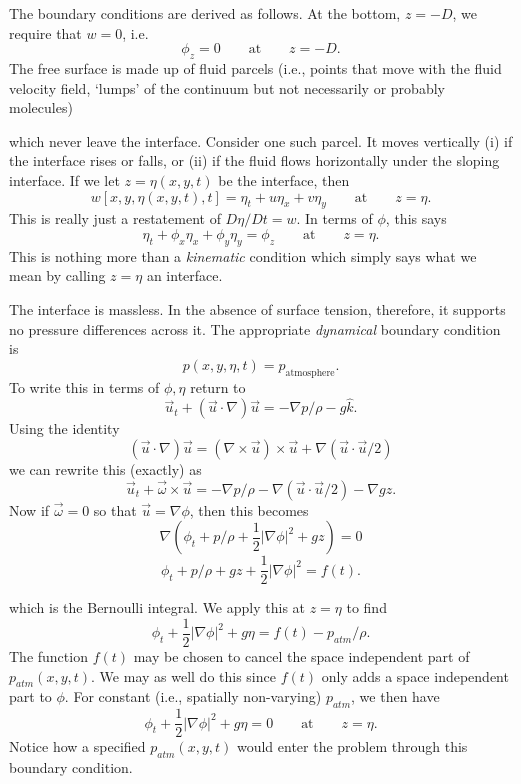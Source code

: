 The boundary conditions are derived as follows. At the bottom, $z=-D$, we
require that $w=0$, i.e.
\[
	\phi_z=0\qquad\text{at}\qquad z=-D.
\]
The free surface is made up of fluid parcels (i.e., points that move with the fluid
velocity field, `lumps' of the continuum but not necessarily or probably molecules)

\sourcepagebreak

which never leave the interface. Consider one such parcel. It moves vertically (i) if the
interface rises or falls, or (ii) if the fluid flows horizontally under the sloping interface.
If we let $z=\eta(x,y,t)$ be the interface, then
\[
	w[x,y,\eta(x,y,t),t]=\eta_t+u\eta_x+v\eta_y
	\qquad\text{at}\qquad z=\eta.
\]
This is really just a restatement of $D\eta/Dt=w$. In terms of $\phi$, this says
\[
	\eta_t+\phi_x\eta_x+\phi_y\eta_y=\phi_z
	\qquad\text{at}\qquad z=\eta.
\]
This is nothing more than a \emph{kinematic} condition which simply says what we mean by
calling $z=\eta$ an interface.

The interface is massless. In the absence of surface tension, therefore, it
supports no pressure differences across it. The appropriate \emph{dynamical} boundary
condition is
\[
	p(x,y,\eta,t)=p_{\mathrm{atmosphere}}.
\]
To write this in terms of $\phi,\eta$ return to
\[
	\vec u_t+(\vec u\cdot\nabla)\vec u=-\nabla p/\rho-g\hat k.
\]
Using the identity
\[
	(\vec u\cdot\nabla)\vec u=(\nabla\times\vec u)\times\vec u
	+\nabla(\vec u\cdot\vec u/2)
\]
we can rewrite this (exactly) as
\[
	\vec u_t+\vec\omega\times\vec u=-\nabla p/\rho
	-\nabla(\vec u\cdot\vec u/2)-\nabla gz.
\]
Now if $\vec\omega=0$ so that $\vec u=\nabla\phi$, then this becomes
\[
	\nabla\left(\phi_t+p/\rho+\frac12|\nabla\phi|^2+gz\right)=0
\]
\[
	\phi_t+p/\rho+gz+\frac12|\nabla\phi|^2=f(t).
\]

\sourcepagebreak

which is the Bernoulli integral. We apply this at $z=\eta$ to find
\[
	\phi_t+\frac12|\nabla\phi|^2+g\eta=f(t)-p_{atm}/\rho.
\]
The function $f(t)$ may be chosen to cancel the space independent part of
$p_{atm}(x,y,t)$. We may as well do this since $f(t)$ only adds a space independent
part to $\phi$. For constant (i.e., spatially non-varying) $p_{atm}$, we then have
\[
	\phi_t+\frac12|\nabla\phi|^2+g\eta=0
	\qquad\text{at}\qquad z=\eta.
\]
Notice how a specified $p_{atm}(x,y,t)$ would enter the problem through this boundary
condition.

